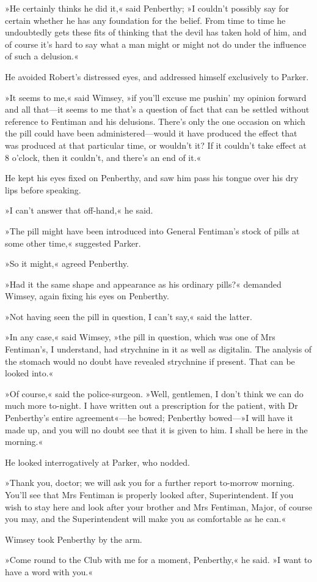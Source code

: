 »He certainly thinks he did it,« said Penberthy; »I couldn't possibly say for certain whether he has any foundation for the belief. From time to time he undoubtedly gets these fits of thinking that the devil has taken hold of him, and of course it's hard to say what a man might or might not do under the influence of such a delusion.«

He avoided Robert's distressed eyes, and addressed himself exclusively to Parker.

»It seems to me,« said Wimsey, »if you'll excuse me pushin' my opinion forward and all that\allowbreak---\allowbreak it seems to me that's a question of fact that can be settled without reference to Fentiman and his delusions. There's only the one occasion on which the pill could have been administered\allowbreak---\allowbreak would it have produced the effect that was produced at that particular time, or wouldn't it? If it couldn't take effect at 8 o'clock, then it couldn't, and there's an end of it.«

He kept his eyes fixed on Penberthy, and saw him pass his tongue over his dry lips before speaking.

»I can't answer that off-hand,« he said.

»The pill might have been introduced into General Fentiman's stock of pills at some other time,« suggested Parker.

»So it might,« agreed Penberthy.

»Had it the same shape and appearance as his ordinary pills?« demanded Wimsey, again fixing his eyes on Penberthy.

»Not having seen the pill in question, I can't say,« said the latter.

»In any case,« said Wimsey, »the pill in question, which was one of Mrs Fentiman's, I understand, had strychnine in it as well as digitalin. The analysis of the stomach would no doubt have revealed strychnine if present. That can be looked into.«

»Of course,« said the police-surgeon. »Well, gentlemen, I don't think we can do much more to-night. I have written out a prescription for the patient, with Dr Penberthy's entire agreement«---he bowed; Penberthy bowed---»I will have it made up, and you will no doubt see that it is given to him. I shall be here in the morning.«

He looked interrogatively at Parker, who nodded.

»Thank you, doctor; we will ask you for a further report to-morrow morning. You'll see that Mrs Fentiman is properly looked after, Superintendent. If you wish to stay here and look after your brother and Mrs Fentiman, Major, of course you may, and the Superintendent will make you as comfortable as he can.«

Wimsey took Penberthy by the arm.

»Come round to the Club with me for a moment, Penberthy,« he said. »I want to have a word with you.«